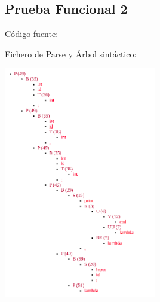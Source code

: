 \documentclass{article}[a4paper]
\begin{document}
\begin{appendices}
\subsection{Prueba Funcional 2}
Código fuente:

\hspace{\parindent} Fichero de Parse y Árbol sintáctico:

\includegraphics[width=0.5\textwidth]{arbol2.png}


\end{appendices}
\end{document}
